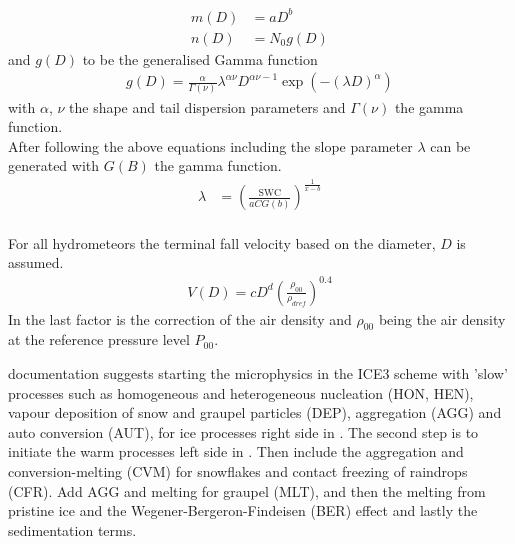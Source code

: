 \begin{align}
m(D) & = aD^b 	\label{eq:mass_diameter} \\
n(D) & = N_0 g(D)	\label{eq:PSD_MEPS}
\end{align}
and $g(D)$ to be the generalised Gamma function 
\begin{align}
g(D) = \frac{\alpha}{\Gamma(\nu)} \lambda^{\alpha \nu} D^{\alpha \nu -1} \exp\left( -(\lambda D)^\alpha \right)
\end{align}
with $\alpha$, $\nu$ the shape and tail dispersion parameters and $\Gamma(\nu)$ the gamma function. 
\\
After following the above equations including  the slope parameter $\lambda$ can be generated with $G(B)$ the gamma function.
\begin{align}
\lambda & = \left( \frac{\text{SWC}}{aCG(b)}\right)^{\frac{1}{x-b}}
\end{align}
\\
For all hydrometeors the terminal fall velocity based on the diameter, $D$ is assumed.
\begin{align}
V(D) = c D^d \left(\frac{\rho_{00}}{\rho_{dref}}\right)^0.4 \label{eq:fall_velo_MEPS}
\end{align}
In  the last factor is the \citet{foote_terminal_1969} correction of the air density and $\rho_{00}$ being the air density at the reference pressure level $P_{00}$.
%

%

\newline
\cite{meteo_france_meso-nh_2009} documentation suggests starting the microphysics in the ICE3 scheme with 'slow' processes such as homogeneous and heterogeneous nucleation (HON, HEN), vapour deposition of snow and graupel particles (DEP), aggregation (AGG) and auto conversion (AUT), for ice processes right side in . The second step is to initiate the warm processes left side in . Then include the aggregation and conversion-melting (CVM) for snowflakes and contact freezing of raindrops (CFR). Add AGG and melting for graupel (MLT), and then the melting from pristine ice  and the Wegener-Bergeron-Findeisen (BER) effect and lastly the sedimentation terms.  \\
